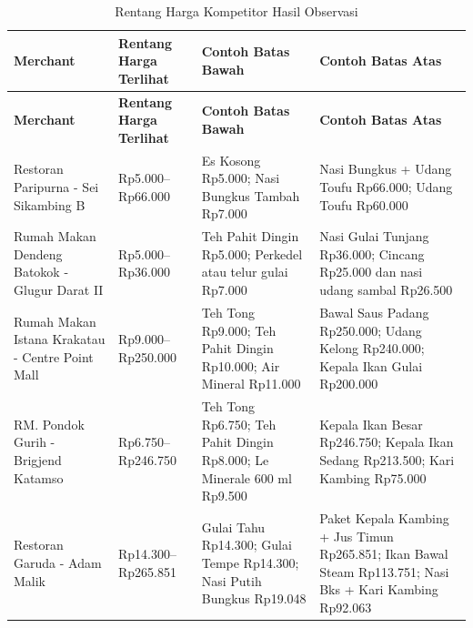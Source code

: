\begingroup
\footnotesize
\begin{xltabular}{\textwidth}{|Z{3.2cm}|C{2.3cm}|Y|Y|}
\caption{Rentang Harga Kompetitor Hasil Observasi}
\label{tab:rentang-harga-kompetitor-terlihat-grabfood-20260619} \\
        \toprule
        \textbf{Merchant} & \textbf{Rentang Harga Terlihat} & \textbf{Contoh Batas Bawah} & \textbf{Contoh Batas Atas} \\ \hline
        \midrule
\endfirsthead
{}
        \toprule
        \textbf{Merchant} & \textbf{Rentang Harga Terlihat} & \textbf{Contoh Batas Bawah} & \textbf{Contoh Batas Atas} \\ \hline
        \midrule
\endhead
{}
\endfoot
        \bottomrule
        \endlastfoot
        Restoran Paripurna - Sei Sikambing B & Rp5.000--Rp66.000 & Es Kosong Rp5.000; Nasi Bungkus Tambah Rp7.000 & Nasi Bungkus + Udang Toufu Rp66.000; Udang Toufu Rp60.000 \\ \hline
        Rumah Makan Dendeng Batokok - Glugur Darat II & Rp5.000--Rp36.000 & Teh Pahit Dingin Rp5.000; Perkedel atau telur gulai Rp7.000 & Nasi Gulai Tunjang Rp36.000; Cincang Rp25.000 dan nasi udang sambal Rp26.500 \\ \hline
        Rumah Makan Istana Krakatau - Centre Point Mall & Rp9.000--Rp250.000 & Teh Tong Rp9.000; Teh Pahit Dingin Rp10.000; Air Mineral Rp11.000 & Bawal Saus Padang Rp250.000; Udang Kelong Rp240.000; Kepala Ikan Gulai Rp200.000 \\ \hline
        RM. Pondok Gurih - Brigjend Katamso & Rp6.750--Rp246.750 & Teh Tong Rp6.750; Teh Pahit Dingin Rp8.000; Le Minerale 600 ml Rp9.500 & Kepala Ikan Besar Rp246.750; Kepala Ikan Sedang Rp213.500; Kari Kambing Rp75.000 \\ \hline
        Restoran Garuda - Adam Malik & Rp14.300--Rp265.851 & Gulai Tahu Rp14.300; Gulai Tempe Rp14.300; Nasi Putih Bungkus Rp19.048 & Paket Kepala Kambing + Jus Timun Rp265.851; Ikan Bawal Steam Rp113.751; Nasi Bks + Kari Kambing Rp92.063 \\ \hline
        \bottomrule
    
\end{xltabular}
\endgroup

